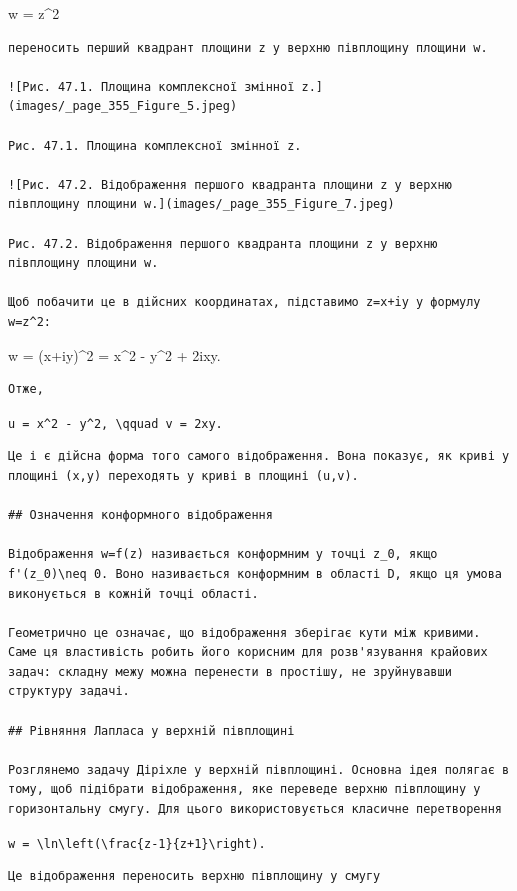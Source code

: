 \documentclass[
  ukrainian,
]{article}
\begin{document}
w = z\^{}2

\begin{verbatim}
переносить перший квадрант площини z у верхню півплощину площини w.

![Рис. 47.1. Площина комплексної змінної z.](images/_page_355_Figure_5.jpeg)

Рис. 47.1. Площина комплексної змінної z.

![Рис. 47.2. Відображення першого квадранта площини z у верхню півплощину площини w.](images/_page_355_Figure_7.jpeg)

Рис. 47.2. Відображення першого квадранта площини z у верхню півплощину площини w.

Щоб побачити це в дійсних координатах, підставимо z=x+iy у формулу w=z^2:
\end{verbatim}

w = (x+iy)\^{}2 = x\^{}2 - y\^{}2 + 2ixy.

\begin{verbatim}
Отже,
\end{verbatim}

\texttt{u\ =\ x\^{}2\ -\ y\^{}2,\ \textbackslash{}qquad\ v\ =\ 2xy.}

\begin{verbatim}
Це і є дійсна форма того самого відображення. Вона показує, як криві у площині (x,y) переходять у криві в площині (u,v).

## Означення конформного відображення

Відображення w=f(z) називається конформним у точці z_0, якщо f'(z_0)\neq 0. Воно називається конформним в області D, якщо ця умова виконується в кожній точці області.

Геометрично це означає, що відображення зберігає кути між кривими. Саме ця властивість робить його корисним для розв'язування крайових задач: складну межу можна перенести в простішу, не зруйнувавши структуру задачі.

## Рівняння Лапласа у верхній півплощині

Розглянемо задачу Діріхле у верхній півплощині. Основна ідея полягає в тому, щоб підібрати відображення, яке переведе верхню півплощину у горизонтальну смугу. Для цього використовується класичне перетворення
\end{verbatim}

\texttt{w\ =\ \textbackslash{}ln\textbackslash{}left(\textbackslash{}frac\{z-1\}\{z+1\}\textbackslash{}right).}

\begin{verbatim}
Це відображення переносить верхню півплощину у смугу
\end{verbatim}
\end{document}
